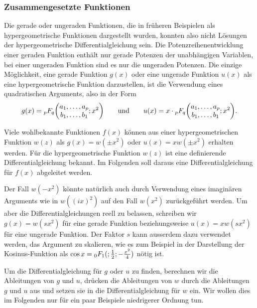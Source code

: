 \subsubsection{Zusammengesetzte Funktionen}
Die gerade oder ungeraden Funktionen, die in früheren Beispielen
als hypergeometrische Funktionen dargestellt wurden, konnten also
nicht Lösungen der hypergeometrische Differentialgleichung sein.
Die Potenzreihenentwicklung einer geraden Funktion enthält nur
gerade Potenzen der unabhängigen Variablen, bei einer ungeraden
Funktion sind es nur die ungeraden Potenzen.
Die einzige Möglichkeit, eine gerade Funktion $g(x)$ oder eine ungerade
Funktion $u(x)$  als eine hypergeometrische Funktion darzustellen,
ist die Verwendung eines quadratischen Arguments, also in der Form
\[
g(x)
=
\mathstrut_pF_q\biggl(\begin{matrix}a_1,\dots,a_p\\b_1,\dots,b_1\end{matrix};x^2\biggr)
\qquad\text{und}\qquad
u(x)
=
x\cdot
\mathstrut_pF_q\biggl(\begin{matrix}a_1,\dots,a_p\\b_1,\dots,b_1\end{matrix};x^2\biggr).
\]

Viele wohlbekannte Funktionen $f(x)$ können aus einer hypergeometrischen
Funktion $w(z)$ als $g(x)=w(\pm x^2)$ oder $u(x)=xw(\pm x^2)$ erhalten
werden.
Für die hypergeometrische Funktion $w(z)$ ist eine definierende
Differentialgleichung bekannt.
Im Folgenden soll daraus eine Differentialgleichung für $f(x)$
abgeleitet werden.

Der Fall $w(-x^2)$ könnte natürlich auch durch Verwendung eines
imaginären Arguments wie in $w((ix)^2)$ auf den Fall $w(x^2)$ 
zurückgeführt werden.
Um aber die Differentialgleichungen reell zu belassen, schreiben
wir $g(x)=w(sx^2)$ für eine gerade Funktion beziehungsweise
$u(x)=xw(sx^2)$ für eine ungerade Funktion.
Der Faktor $s$ kann ausserdem dazu verwendet werden, das Argument
zu skalieren, wie es zum Beispiel in der Darstellung der
Kosinus-Funktion als $\cos x = \mathstrut_0F_1(;\frac12;-\frac{x^2}4)$
nötig ist.

Um die Differentialgleichung für $g$ oder $u$ zu finden, berechnen wir die
Ableitungen von $g$ und $u$, drücken die Ableitungen von $w$ durch die
Ableitungen $g$ und $u$ aus und setzen sie in die Differentialgleichung
für $w$ ein.
Wir wollen dies im Folgenden nur für ein paar Beispiele niedrigerer
Ordnung tun.

%
%
